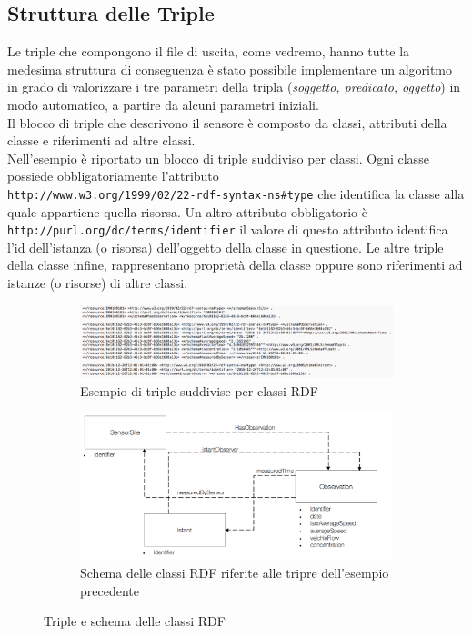 \documentclass[12pt,a4paper,italian]{article}
\begin{document}
\subsection{Struttura delle Triple}
Le triple che compongono il file di uscita, come vedremo, hanno tutte la medesima struttura di conseguenza è stato possibile implementare un algoritmo in grado di valorizzare
i tre parametri della tripla (\emph{soggetto, predicato, oggetto}) in modo automatico, a partire da alcuni parametri iniziali.\\
Il blocco di triple che descrivono il sensore è composto da classi, attributi della classe e riferimenti ad altre classi.\\
Nell'esempio è riportato un blocco di triple suddiviso per classi. Ogni classe possiede obbligatoriamente l'attributo\\ \texttt{http://www.w3.org/1999/02/22-rdf-syntax-ns\#type} che identifica la classe alla quale appartiene quella risorsa.
Un altro attributo obbligatorio è \texttt{http://purl.org/dc/terms/identifier} il valore di questo attributo identifica l'id dell'istanza (o risorsa) dell'oggetto della classe in questione.
Le altre triple della classe infine, rappresentano proprietà della classe oppure sono riferimenti ad istanze (o risorse) di altre classi.
\begin{figure}[!h]
	\begin{subfigure}{1\textwidth}
		\centering
		\includegraphics[width=14cm]{img/triple.png}
		\caption{Esempio di triple suddivise per classi RDF}\label{triplerdf}
	\end{subfigure}
	\begin{subfigure}{1\textwidth}
		\centering
		\includegraphics[width=14cm]{img/schema.png}
		\caption{Schema delle classi RDF riferite alle tripre dell'esempio precedente}\label{schema}
	\end{subfigure}
	\caption{Triple e schema delle classi RDF}\label{rdfcombo}
\end{figure}
\end{document}
